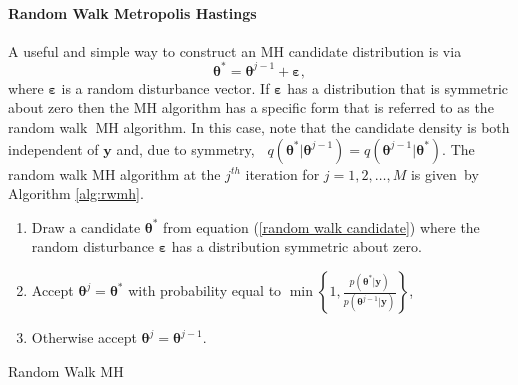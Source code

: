 \documentclass[article]{jss}
\begin{document}
\paragraph{Random Walk Metropolis Hastings \protect \protect \\
}

A useful and simple way to construct an MH candidate distribution is
via\begin{equation}
  \bm{\theta}^{\ast}=\bm{\theta}^{j-1}+\bm{\bm{\varepsilon}},\label{random
    walk candidate}\end{equation} where $\bm{\varepsilon}$ is a random
disturbance vector. If $\bm{\varepsilon}$ has a distribution that is
symmetric about zero then the MH algorithm has a specific form that is
referred to as the random walk\textbf{\ }MH algorithm. In this case,
note that the candidate density is both independent of $\bm{y}$ and,
due to symmetry, \textbf{\
}$q\left(\bm{\theta}^{\ast}|\bm{\theta}^{j-1}\right)=q\left(\bm{\theta}^{j-1}|\bm{\theta}^{\ast}\right)$.
The random walk MH algorithm at the $j^{th}$ iteration for
$j=1,2,\ldots,M$ is given\emph{\ }by Algorithm \ref{alg:rwmh}.

%
\begin{algorithm}[H]
  \begin{enumerate}
  \item Draw a candidate $\bm{\theta}^{\ast}$ from equation
    (\ref{random walk candidate}) where the random disturbance
    $\bm{\varepsilon}$ has a distribution symmetric about zero.
  \item Accept $\bm{\theta}^{j}=\bm{\theta}^{\ast}$ with probability
    equal to $\min\left\{
      1,\frac{p\left(\bm{\theta}^{\ast}|\bm{y}\right)}{p\left(\bm{\theta}^{j-1}|\bm{y}\right)}\right\}
    $,
  \item Otherwise accept $\bm{\theta}^{j}=\bm{\theta}^{j-1}.$
  \end{enumerate}
  \caption{Random Walk MH}
\label{alg:rwmh}
\end{algorithm}
\end{document}
